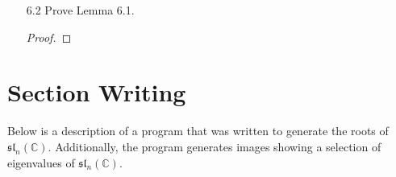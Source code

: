 \documentclass[12pt]{article}
\theoremstyle{definition}
\theoremstyle{definition}
\newenvironment{solution}
  {\renewcommand\qedsymbol{$\blacksquare$}\begin{proof}[Solution]}
  {\end{proof}}
\begin{document}
\begin{enumerate}
\begin{solution}
\begin{align*}
                    &\text{ad}_{h_1}(x_1)=2x_1& &\text{ad}_{h_2}(x_1)=-x_1& \\
                    &\text{ad}_{h_1}(x_2)=-x_2& &\text{ad}_{h_2}(x_2)=2x_2& \\
                    &\text{ad}_{h_1}(x_3)=x_3& &\text{ad}_{h_2}(x_3)=x_3& \\
                    &\text{ad}_{h_1}(y_1)=-2y_1& &\text{ad}_{h_2}(y_1)=y_1& \\
                    &\text{ad}_{h_1}(y_2)=y_2& &\text{ad}_{h_2}(y_2)=-2y_2 \\
                    &\text{ad}_{h_1}(y_3)=-y_3& &\text{ad}_{h_2}(y_3)=-y_3&
                \end{align*}
            \end{solution}
        \item[6.2] Prove Lemma 6.1.
            \begin{proof}
                
            \end{proof}
    \end{enumerate}
    \section{Section Writing}
    Below is a description of a program that was written to 
    generate the roots of $\mathfrak{sl}_n(\mathbb{C})$. Additionally, 
    the program generates images showing a selection of eigenvalues of 
    $\mathfrak{sl}_n(\mathbb{C})$.
\end{document}
